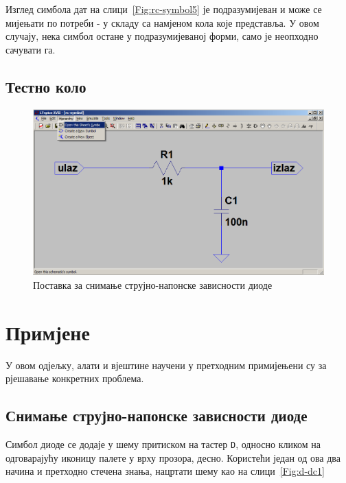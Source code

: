 Изглед симбола дат на слици~\ref{Fig:rc-symbol5} је подразумијеван и може се мијењати по потреби - у складу са намјеном кола које представља. У овом случају, нека симбол остане у подразумијеваној форми, само је неопходно сачувати га.

\section{Тестно коло}



\begin{figure}[h]
\centering
\includegraphics[width=\figwidth\textwidth]{figs/rc-symbol3.PNG}
\caption{Поставка за снимање струјно-напонске зависности диоде}
\label{Fig:rc-symbol6}
\end{figure}

\chapter{Примјене}

У овом одјељку, алати и вјештине научени у претходним примијењени су за рјешавање конкретних проблема.

\section{Снимање струјно-напонске зависности диоде}

Симбол диоде се додаје у шему притиском на тастер \texttt{D}, односно кликом на одговарајућу иконицу палете у врху прозора, десно. Користећи један од ова два начина и претходно стечена знања, нацртати шему као на слици~\ref{Fig:d-dc1}

